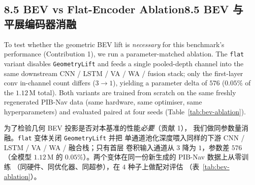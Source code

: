 \documentclass[11pt,a4paper]{article}
\newcommand{\en}[1]{\par\noindent #1\par\vspace{0.15em}}
\newcommand{\zh}[1]{\par\noindent\color{zhcol}\hspace{0.5em}#1\par\color{black}\vspace{0.6em}}
\newcommand{\bisubsec}[2]{\subsection[#1]{#1\quad\normalfont\small\color{zhcol}\textsf{#2}}}
\begin{document}
\bisubsec{8.5 BEV vs Flat-Encoder Ablation}{8.5 BEV 与平展编码器消融}
\label{subsec:bev-ablation}

\en{To test whether the geometric BEV lift is \emph{necessary} for
this benchmark's performance (Contribution 1), we run a
parameter-matched ablation. The \texttt{flat} variant disables
\texttt{GeometryLift} and feeds a single pooled-depth channel into the
same downstream CNN / LSTM / VA / WA / fusion stack; only the
first-layer conv in-channel count differs ($3 \to 1$), yielding a
parameter delta of $576$ (\textbf{$0.05\%$} of the $1.12$\,M total).
Both variants are trained from scratch on the same freshly regenerated
PIB-Nav data (same hardware, same optimiser, same hyperparameters)
and evaluated paired at four seeds (Table~\ref{tab:bev-ablation}).}

\zh{\textsf{为了检验几何 BEV 投影是否对本基准的性能\emph{必要}（贡献 1），
我们做同参数量消融。\texttt{flat} 变体关闭 \texttt{GeometryLift} 并把
单通道池化深度喂入同样的下游 CNN / LSTM / VA / WA / 融合栈；只有首层
卷积输入通道从 $3$ 降为 $1$，参数差 $576$（全模型 $1.12$\,M 的
\textbf{$0.05\%$}）。两个变体在同一份新生成的 PIB-Nav 数据上从零训练
（同硬件、同优化器、同超参），在 $4$ 种子上做配对评估
（表~\ref{tab:bev-ablation}）。}}
\end{document}
